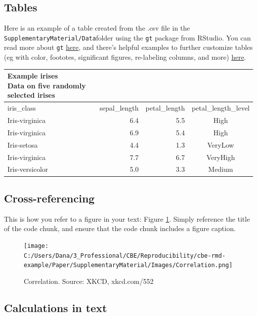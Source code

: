 \documentclass[]{elsarticle} %
\begin{document}
\subsection{Tables}\label{tables}

Here is an example of a table created from the .csv file in the
\texttt{SupplementaryMaterial/Data}folder using the \texttt{gt} package
from RStudio. You can read more about \texttt{gt}
\href{https://github.com/rstudio/gt}{here}, and there's helpful examples
to further customize tables (eg with color, foototes, significant
figures, re-labeling columns, and more)
\href{https://github.com/allisonhorst/gt-awesome-tables}{here}.

\captionsetup[table]{labelformat=empty,skip=1pt}

\begin{longtable}{lrrc}
\caption*{
\large Example irises\\ 
\small Data on five randomly selected irises\\ 
} \\ 
\toprule
iris\_class & sepal\_length & petal\_length & petal\_length\_level \\ 
\midrule
Iris-virginica & 6.4 & 5.5 & High \\ 
Iris-virginica & 6.9 & 5.4 & High \\ 
Iris-setosa & 4.4 & 1.3 & VeryLow \\ 
Iris-virginica & 7.7 & 6.7 & VeryHigh \\ 
Iris-versicolor & 5.0 & 3.3 & Medium \\ 
\bottomrule
\end{longtable}

\subsection{Cross-referencing}\label{cross-referencing}

This is how you refer to a figure in your text: Figure
\ref{fig:correlation}. Simply reference the title of the code chunk, and
ensure that the code chunk includes a figure caption.

\begin{figure}
\centering
\texttt{[image: C:/Users/Dana/3\_Professional/CBE/Reproducibility/cbe-rmd-example/Paper/SupplementaryMaterial/Images/Correlation.png]}
\caption{\label{fig:correlation}Correlation. Source: XKCD, xkcd.com/552}
\end{figure}

\subsection{Calculations in text}\label{calculations-in-text}
\end{document}
